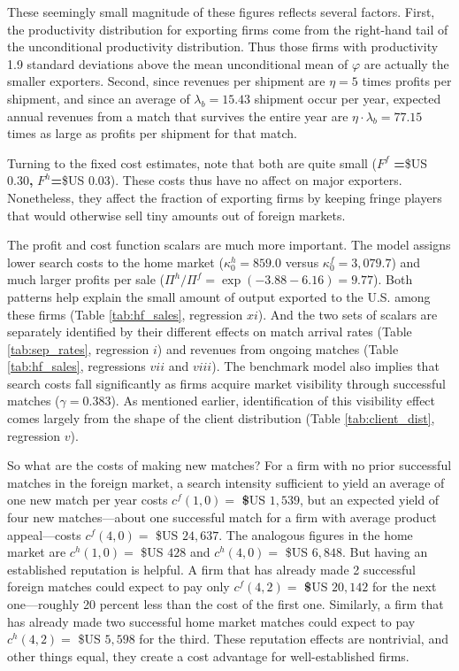\documentclass[12pt]{article}
\begin{document}
These seemingly small magnitude of these figures reflects several factors.
First, the productivity distribution for exporting firms come from the
right-hand tail of the unconditional productivity distribution. Thus those
firms with productivity 1.9 standard deviations above the mean unconditional
mean of $\varphi $ are actually the smaller exporters. Second, since
revenues per shipment are $\eta =5$ times profits per shipment, and since an
average of $\lambda _{b}=15.43$ shipment occur per year, expected annual
revenues from a match that survives the entire year are $\eta \cdot \lambda
_{b}=77.15$ times as large as profits per shipment for that match.

Turning to the fixed cost estimates, note that both are quite small ($F^{f}$%
\textbf{=}\$US 0.30\textbf{, }$F^{h}$\textbf{=}\$US 0.03). These costs thus
have no affect on major exporters. Nonetheless, they affect the fraction of
exporting firms by keeping fringe players that would otherwise sell tiny
amounts out of foreign markets.

The profit and cost function scalars are much more important. The model
assigns lower search costs to the home market ($\kappa _{0}^{h}=859.0$
versus $\kappa _{0}^{f}=3,079.7$) and much larger profits per sale ($\Pi
^{h}/\Pi ^{f}=\exp \left( -3.88-6.16\right) =9.77$). Both patterns help
explain the small amount of output exported to the U.S. among these firms
(Table \ref{tab:hf_sales}, regression $xi$). And the two sets of scalars are
separately identified by their different effects on match arrival rates
(Table \ref{tab:sep_rates}, regression $i$) and revenues from ongoing
matches (Table \ref{tab:hf_sales}, regressions $vii$ and $viii$). The
benchmark model also implies that search costs fall significantly as firms
acquire market visibility through successful matches ($\gamma =0.383$). As
mentioned earlier, identification of this visibility effect comes largely
from the shape of the client distribution (Table \ref{tab:client_dist},
regression $v$).

So what are the costs of making new matches? For a firm with no prior
successful matches in the foreign market, a search intensity sufficient to
yield an average of one new match per year costs $c^{f}(1,0)=$ \textbf{\$}US 
$1,539$, but an expected yield of four new matches---about one successful
match for a firm with average product appeal---costs $c^{f}(4,0)=$ \$US $%
24,637$. The analogous figures in the home market are $c^{h}(1,0)=$ \$US $%
428 $ and $c^{h}(4,0)=$ \$US $6,848$. But having an established reputation
is helpful. A firm that has already made 2 successful foreign matches could
expect to pay only $c^{f}(4,2)=$ \textbf{\$}US $20,142$ for the next
one---roughly 20 percent less than the cost of the first one. Similarly, a
firm that has already made two successful home market matches could expect
to pay $c^{h}(4,2)=$ \$US $5,598$ for the third. These reputation effects
are nontrivial, and other things equal, they create a cost advantage for
well-established firms.
\end{document}

